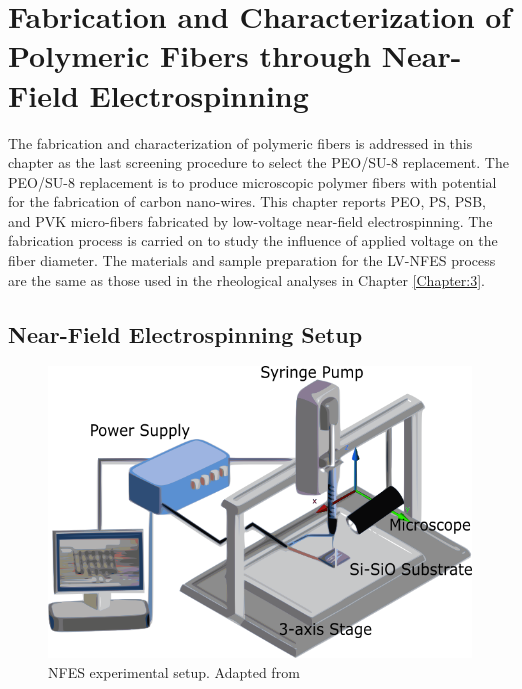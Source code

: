 
\chapter{Fabrication and Characterization of Polymeric Fibers through Near-Field Electrospinning} %

\label{Chapter:4}

The fabrication and characterization of polymeric fibers is addressed in this chapter as the last screening procedure to select the PEO/SU-8 replacement. The PEO/SU-8 replacement is to produce microscopic polymer fibers with potential for the fabrication of carbon nano-wires. This chapter reports PEO, PS, PSB, and PVK micro-fibers fabricated by low-voltage near-field electrospinning. The fabrication process is carried on to study the influence of applied voltage on the fiber diameter. The materials and sample preparation for the LV-NFES process are the same as those used in the rheological analyses in Chapter \ref{Chapter:3}.

\section{Near-Field Electrospinning Setup}

\begin{figure}[!th]
\centering
\includegraphics[scale=0.50]{./Figures/NFESsetup.png}
\decoRule
\caption[NFES experimental setup]{NFES experimental setup. Adapted from \cite{Floreshernandez2020}}
\label{fig:NFESsetup}
\end{figure}

